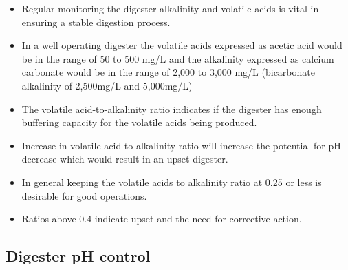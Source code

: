 \begin{itemize}
                        \item Regular monitoring the digester alkalinity and volatile acids is vital in ensuring a stable digestion process.
                        \item In a well operating digester the volatile acids expressed as acetic acid would be in the range of 50 to 500 mg/L and the alkalinity expressed as calcium carbonate would be in the range of 2,000 to 3,000 mg/L (bicarbonate alkalinity of 2,500mg/L and 5,000mg/L)
                        \item The volatile acid-to-alkalinity ratio indicates if the digester has enough buffering capacity for the volatile acids being produced.
                         \item Increase in volatile acid to-alkalinity ratio will increase the potential for pH decrease which would result in an upset digester.
                         \item In general keeping the volatile acids to alkalinity ratio at 0.25 or less is desirable for good operations.
                        \item Ratios above 0.4 indicate upset and the need for corrective action.\\
                                            \end{itemize}
\subsection{Digester pH control}                        
    
